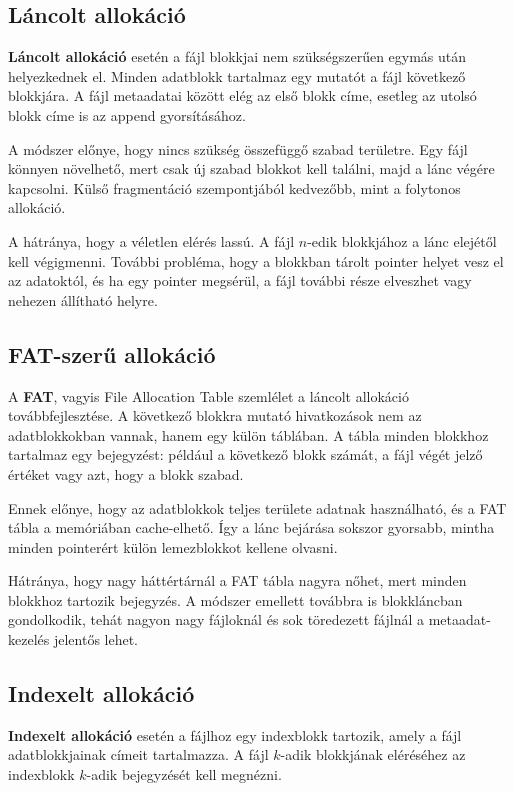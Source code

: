 \subsection{Láncolt allokáció}

\textbf{Láncolt allokáció} esetén a fájl blokkjai nem szükségszerűen egymás után helyezkednek el. Minden adatblokk tartalmaz egy mutatót a fájl következő blokkjára. A fájl metaadatai között elég az első blokk címe, esetleg az utolsó blokk címe is az append gyorsításához.

A módszer előnye, hogy nincs szükség összefüggő szabad területre. Egy fájl könnyen növelhető, mert csak új szabad blokkot kell találni, majd a lánc végére kapcsolni. Külső fragmentáció szempontjából kedvezőbb, mint a folytonos allokáció.

A hátránya, hogy a véletlen elérés lassú. A fájl \(n\)-edik blokkjához a lánc elejétől kell végigmenni. További probléma, hogy a blokkban tárolt pointer helyet vesz el az adatoktól, és ha egy pointer megsérül, a fájl további része elveszhet vagy nehezen állítható helyre.

\subsection{FAT-szerű allokáció}

A \textbf{FAT}, vagyis File Allocation Table szemlélet a láncolt allokáció továbbfejlesztése. A következő blokkra mutató hivatkozások nem az adatblokkokban vannak, hanem egy külön táblában. A tábla minden blokkhoz tartalmaz egy bejegyzést: például a következő blokk számát, a fájl végét jelző értéket vagy azt, hogy a blokk szabad.

Ennek előnye, hogy az adatblokkok teljes területe adatnak használható, és a FAT tábla a memóriában cache-elhető. Így a lánc bejárása sokszor gyorsabb, mintha minden pointerért külön lemezblokkot kellene olvasni.

Hátránya, hogy nagy háttértárnál a FAT tábla nagyra nőhet, mert minden blokkhoz tartozik bejegyzés. A módszer emellett továbbra is blokkláncban gondolkodik, tehát nagyon nagy fájloknál és sok töredezett fájlnál a metaadat-kezelés jelentős lehet.

\subsection{Indexelt allokáció}

\textbf{Indexelt allokáció} esetén a fájlhoz egy indexblokk tartozik, amely a fájl adatblokkjainak címeit tartalmazza. A fájl \(k\)-adik blokkjának eléréséhez az indexblokk \(k\)-adik bejegyzését kell megnézni.

